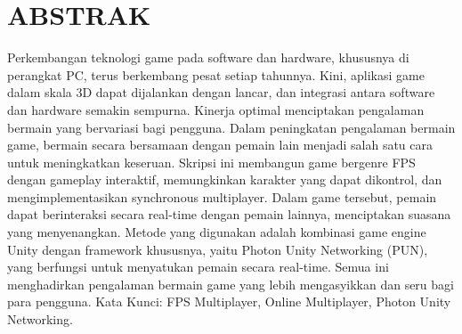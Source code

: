 \chapter*{ABSTRAK}
\noindent


Perkembangan teknologi game pada software dan hardware, khususnya di perangkat PC, terus berkembang pesat setiap tahunnya. Kini, aplikasi game dalam skala 3D dapat dijalankan dengan lancar, dan integrasi antara software dan hardware semakin sempurna. Kinerja optimal menciptakan pengalaman bermain yang bervariasi bagi pengguna. Dalam peningkatan pengalaman bermain game, bermain secara bersamaan dengan pemain lain menjadi salah satu cara untuk meningkatkan keseruan. Skripsi ini membangun game bergenre FPS dengan gameplay interaktif, memungkinkan karakter yang dapat dikontrol, dan mengimplementasikan synchronous multiplayer. Dalam game tersebut, pemain dapat berinteraksi secara real-time dengan pemain lainnya, menciptakan suasana yang menyenangkan. Metode yang digunakan adalah kombinasi game engine Unity dengan framework khususnya, yaitu Photon Unity Networking (PUN), yang berfungsi untuk menyatukan pemain secara real-time. Semua ini menghadirkan pengalaman bermain game yang lebih mengasyikkan dan seru bagi para pengguna.
\newline \break
\noindent Kata Kunci: FPS Multiplayer, Online Multiplayer, Photon Unity Networking.